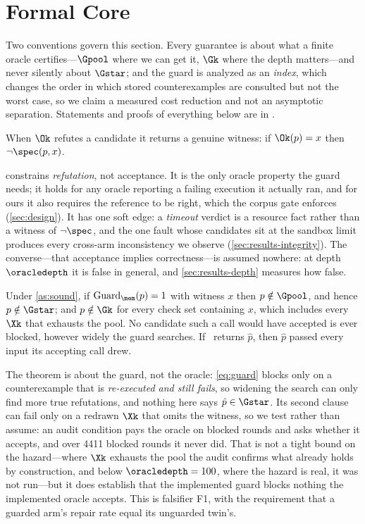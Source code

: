 \section{Formal Core}
\label{sec:theory}

Two conventions govern this section. Every guarantee is about what a finite
oracle certifies---$\Gpool$ where we can get it, $\Gk$ where the depth
matters---and never silently about $\Gstar$; and the
guard is analyzed as an \emph{index}, which changes the order in which stored
counterexamples are consulted but not the worst case, so we claim a measured
cost reduction and not an asymptotic separation. Statements and proofs of
everything below are in .

\begin{assumption}
\label{as:sound}
When $\Ok$ refutes a candidate it returns a genuine witness: if
$\Ok(p) = x$ then $\lnot\spec(p, x)$.
\end{assumption}

 constrains \emph{refutation}, not acceptance. It is the only
oracle property the guard needs; it holds for any oracle reporting a failing
execution it actually ran, and for ours it also requires the reference to be
right, which the corpus gate enforces (\cref{sec:design}). It has one soft
edge: a \emph{timeout} verdict is a resource fact rather than a witness of
$\lnot\spec$, and the one fault whose candidates sit at the sandbox limit
produces every cross-arm inconsistency we observe
(\cref{sec:results-integrity}). The converse---that acceptance implies
correctness---is assumed nowhere: at depth $\oracledepth$ it is false in
general, and \cref{sec:results-depth} measures how false.

\begin{theorem}
\label{thm:sound}
Under \cref{as:sound}, if $\mathrm{Guard}_\mem(p) = 1$ with witness $x$ then
$p \notin \Gpool$, and hence $p \notin \Gstar$; and $p \notin \Gk$ for every
check set containing $x$, which includes every $\Xk$ that exhausts the pool. No
candidate such a call would have accepted is ever blocked, however widely the
guard searches. If \CEGMem\ returns $\hat p$, then $\hat p$ passed every input
its accepting call drew.
\end{theorem}

The theorem is about the guard, not the oracle: \cref{eq:guard} blocks only on
a counterexample that is \emph{re-executed and still fails}, so widening the
search can only find more true refutations, and nothing here says
$\hat p \in \Gstar$. Its second clause can fail only on a redrawn $\Xk$ that
omits the witness, so we test rather than assume: an audit condition pays the
oracle on blocked rounds and asks whether it accepts, and over \num{4411}
blocked rounds it never did. That is not a tight bound on the hazard---where
$\Xk$ exhausts the pool the audit confirms what already holds by construction,
and below $\oracledepth = 100$, where the hazard is real, it was not run---but
it does establish that the implemented guard blocks nothing the implemented
oracle accepts. This is falsifier F1, with the requirement that a guarded arm's
repair rate equal its unguarded twin's.


